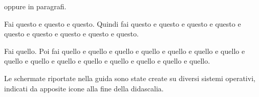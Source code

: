 oppure in paragrafi.

\nix{} \osx{}Fai questo e questo e questo. Quindi fai questo e questo e questo e questo e questo e questo e questo e questo e questo.

\win{}Fai quello. Poi fai quello e quello e quello e quello e quello e quello e quello e quello e quello e quello e quello e quello e quello e quello e quello.

Le schermate riportate nella guida sono state create su diversi sistemi operativi, indicati da apposite icone alla fine della didascalia.